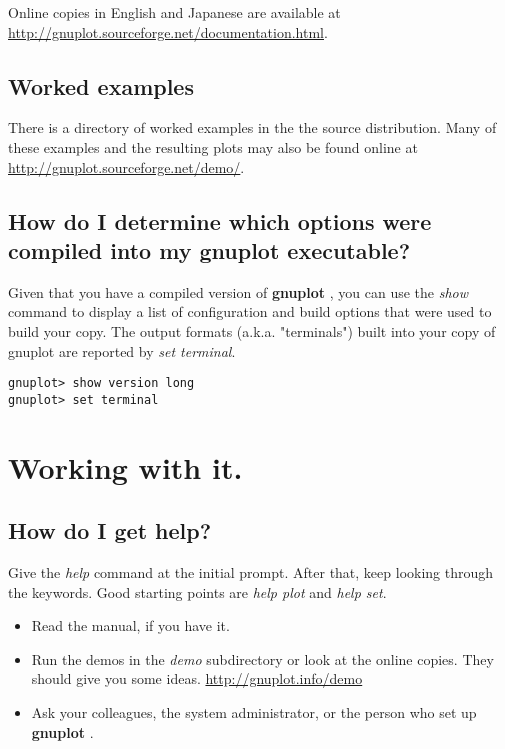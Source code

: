 \documentclass[letter,11pt]{article}
\def\http#1{{\small\href{http://#1}{\url{http://#1}}}}
\newcommand{\http}[1]%
            {\htmladdnormallink{\latex{\url{http://#1}}%
                    \html{\textit{http://#1}}}%
                {http://#1}%
            }
\newcommand{\gnuplot}{\textbf{gnuplot }}
\begin{document}
{Online copies in English and Japanese are available at
\http{gnuplot.sourceforge.net/documentation.html}.

\subsection{Worked examples}

There is a directory of worked examples in the the source distribution.
Many of these examples and the resulting plots may also be found online at
\http{gnuplot.sourceforge.net/demo/}.


\subsection{How do I determine which options were compiled into my \gnuplot executable?}

Given that you have a compiled version of \gnuplot, you can use the
{\em show} command to display a list of configuration and build options
that were used to build your copy.  The output formats (a.k.a. "terminals")
built into your copy of gnuplot are reported by {\em set terminal}.

\small
\begin{verbatim}
gnuplot> show version long
gnuplot> set terminal
\end{verbatim}
\normalsize


\section{Working with it.}

\subsection{How do I get help?}

Give the {\em help} command at the initial prompt. After that, keep
looking through the keywords. Good starting points are {\em help plot}
and {\em help set}.

\begin{itemize}
\item
Read the manual, if you have it.

\item
Run the demos in the {\em demo} subdirectory or look at the
online copies. They should give you some ideas.
\http{gnuplot.info/demo}

\item
Ask your colleagues, the system administrator, or the person who
set up \gnuplot.


\end{itemize}}
\end{document}
